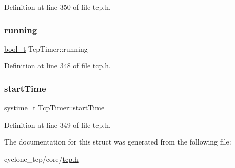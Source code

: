 Definition at line 350 of file tcp.\+h.

\mbox{\label{structTcpTimer_adadb16ad3ae86a863d6d8f4f9ddb54d6}} 
\subsubsection{\texorpdfstring{running}{running}}
{\footnotesize\ttfamily \hyperlink{compiler__port_8h_a812d16e5494522586b3784e55d479912}{bool\+\_\+t} Tcp\+Timer\+::running}



Definition at line 348 of file tcp.\+h.

\mbox{\label{structTcpTimer_a567cd1bec04b2683a21940b9dea3f210}} 
\subsubsection{\texorpdfstring{start\+Time}{startTime}}
{\footnotesize\ttfamily \hyperlink{compiler__port_8h_ae3e32a98d431a02106616da3071832dd}{systime\+\_\+t} Tcp\+Timer\+::start\+Time}



Definition at line 349 of file tcp.\+h.



The documentation for this struct was generated from the following file\+:\begin{DoxyCompactItemize}
\item 
cyclone\+\_\+tcp/core/\hyperlink{tcp_8h}{tcp.\+h}\end{DoxyCompactItemize}
